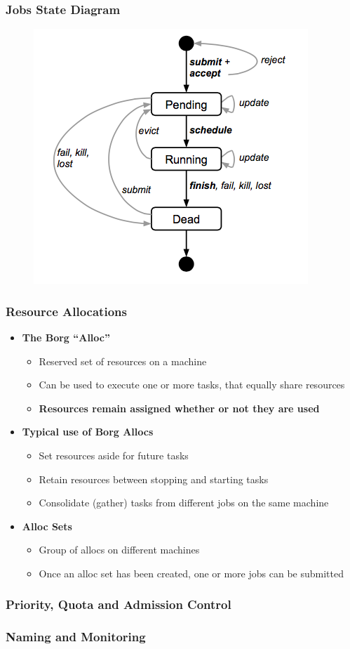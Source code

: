 \begin{frame}
\frametitle{Jobs State Diagram}
\begin{figure}[h]
  \centering
  \includegraphics[scale=0.5]{./figures/borg_state_diagram}
  \label{fig:borg_state_diagram}
\end{figure}
\end{frame}

\begin{frame}
\frametitle{Resource Allocations}
\begin{itemize}
	\item {\bf The Borg ``Alloc''}
	\begin{itemize}
		\item Reserved set of resources on a machine
		\item Can be used to execute one or more tasks, that equally share resources
		\item {\bf Resources remain assigned whether or not they are used}
	\end{itemize}
	\item {\bf Typical use of Borg Allocs}
	\begin{itemize}
		\item Set resources aside for future tasks
		\item Retain resources between stopping and starting tasks
		\item Consolidate (gather) tasks from different jobs on the same machine
	\end{itemize}
	\item {\bf Alloc Sets}
	\begin{itemize}
		\item Group of allocs on different machines
		\item Once an alloc set has been created, one or more jobs can be submitted
	\end{itemize}
\end{itemize}
\end{frame}

\begin{frame}
\frametitle{Priority, Quota and Admission Control}
\end{frame}

\begin{frame}
\frametitle{Naming and Monitoring}
\end{frame}
